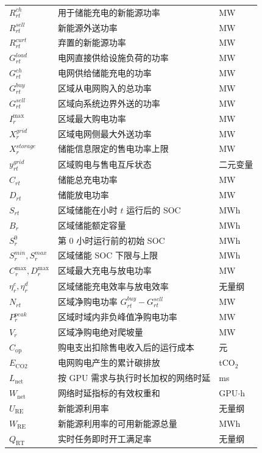 {\begin{longtable}{lll}
$R_{rt}^{ch}$ & 用于储能充电的新能源功率 & MW \\
$R_{rt}^{sell}$ & 新能源外送功率 & MW \\
$R_{rt}^{curt}$ & 弃置的新能源功率 & MW \\
$G_{rt}^{load}$ & 电网直接供给设施负荷的功率 & MW \\
$G_{rt}^{ch}$ & 电网供给储能充电的功率 & MW \\
$G_{rt}^{buy}$ & 区域从电网购入的总功率 & MW \\
$G_{rt}^{sell}$ & 区域向系统边界外送的功率 & MW \\
$I_r^{\max}$ & 区域最大购电功率 & MW \\
$X_r^{grid}$ & 区域电网侧最大外送功率 & MW \\
$X_r^{storage}$ & 储能信息限定的售电功率上限 & MW \\
$y_{rt}^{grid}$ & 区域购电与售电互斥状态 & 二元变量 \\
$C_{rt}$ & 储能总充电功率 & MW \\
$D_{rt}$ & 储能放电功率 & MW \\
$S_{rt}$ & 区域储能在小时 $t$ 运行后的 SOC & MWh \\
$B_r$ & 区域储能额定容量 & MWh \\
$S_r^0$ & 第 $0$ 小时运行前的初始 SOC & MWh \\
$S_r^{min},S_r^{max}$ & 区域储能 SOC 下限与上限 & MWh \\
$C_r^{\max},D_r^{\max}$ & 区域最大充电与放电功率 & MW \\
$\eta_r^c,\eta_r^d$ & 区域储能充电效率与放电效率 & 无量纲 \\
$N_{rt}$ & 区域净购电功率 $G_{rt}^{buy}-G_{rt}^{sell}$ & MW \\
$P_r^{peak}$ & 区域时域内非负峰值净购电功率 & MW \\
$V_r$ & 区域净购电绝对爬坡量 & MW \\
$C_{\mathrm{op}}$ & 购电支出扣除售电收入后的运行成本 & 元 \\
$E_{\mathrm{CO2}}$ & 电网购电产生的累计碳排放 & tCO$_2$ \\
$L_{\mathrm{net}}$ & 按 GPU 需求与执行时长加权的网络时延 & ms \\
$W_{\mathrm{net}}$ & 网络时延指标的有效权重和 & GPU$\cdot$h \\
$U_{\mathrm{RE}}$ & 新能源利用率 & 无量纲 \\
$W_{\mathrm{RE}}$ & 新能源利用率的可用新能源总量 & MWh \\
$Q_{\mathrm{RT}}$ & 实时任务即时开工满足率 & 无量纲 \\

\end{longtable}}
